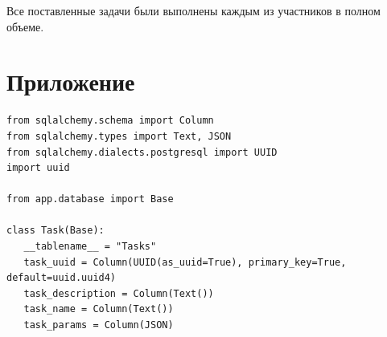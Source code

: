 \documentclass{altsu-report}
\begin{document}
Все поставленные задачи были выполнены каждым из участников в полном объеме.

\newpage
{}
\printbibliography[title={Список использованных источников}]

\chapter*{Приложение}

\begin{code}
\label{code:pi-example}
\begin{verbatim}
from sqlalchemy.schema import Column
from sqlalchemy.types import Text, JSON
from sqlalchemy.dialects.postgresql import UUID
import uuid

from app.database import Base

class Task(Base):
   __tablename__ = "Tasks"
   task_uuid = Column(UUID(as_uuid=True), primary_key=True, default=uuid.uuid4)
   task_description = Column(Text())
   task_name = Column(Text())
   task_params = Column(JSON)
\end{verbatim}
\end{code}
\end{document}
